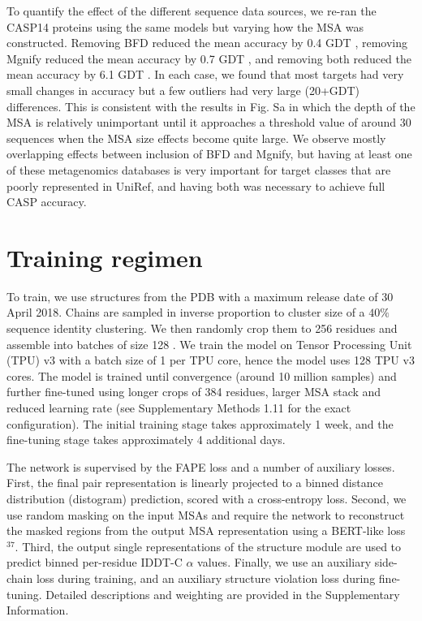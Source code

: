 \documentclass[10pt]{article}
\begin{document}
To quantify the effect of the different sequence data sources, we re-ran the CASP14 proteins using the same models but varying how the MSA was constructed. Removing BFD reduced the mean accuracy by 0.4 GDT , removing Mgnify reduced the mean accuracy by 0.7 GDT , and removing both reduced the mean accuracy by 6.1 GDT . In each case, we found that most targets had very small changes in accuracy but a few outliers had very large (20+GDT) differences. This is consistent with the results in Fig. Sa in which the depth of the MSA is relatively unimportant until it approaches a threshold value of around 30 sequences when the MSA size effects become quite large. We observe mostly overlapping effects between inclusion of BFD and Mgnify, but having at least one of these metagenomics databases is very important for target classes that are poorly represented in UniRef, and having both was necessary to achieve full CASP accuracy.

\section*{Training regimen}
To train, we use structures from the PDB with a maximum release date of 30 April 2018. Chains are sampled in inverse proportion to cluster size of a $40 \%$ sequence identity clustering. We then randomly crop them to 256 residues and assemble into batches of size 128 . We train the model on Tensor Processing Unit (TPU) v3 with a batch size of 1 per TPU core, hence the model uses 128 TPU v3 cores. The model is trained until convergence (around 10 million samples) and further fine-tuned using longer crops of 384 residues, larger MSA stack and reduced learning rate (see Supplementary Methods 1.11 for the exact configuration). The initial training stage takes approximately 1 week, and the fine-tuning stage takes approximately 4 additional days.

The network is supervised by the FAPE loss and a number of auxiliary losses. First, the final pair representation is linearly projected to a binned distance distribution (distogram) prediction, scored with a cross-entropy loss. Second, we use random masking on the input MSAs and require the network to reconstruct the masked regions from the output MSA representation using a BERT-like loss ${ }^{37}$. Third, the output single representations of the structure module are used to predict binned per-residue IDDT-C $\alpha$ values. Finally, we use an auxiliary side-chain loss during training, and an auxiliary structure violation loss during fine-tuning. Detailed descriptions and weighting are provided in the Supplementary Information.
\end{document}
